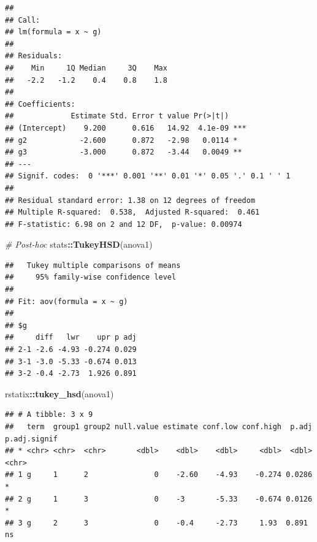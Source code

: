 \documentclass[
]{book}
\newenvironment{Shaded}{\begin{snugshade}}{\end{snugshade}}
\newcommand{\CommentTok}[1]{\textcolor[rgb]{0.56,0.35,0.01}{\textit{#1}}}
\newcommand{\KeywordTok}[1]{\textcolor[rgb]{0.13,0.29,0.53}{\textbf{#1}}}
\newcommand{\NormalTok}[1]{#1}
\newcommand{\OperatorTok}[1]{\textcolor[rgb]{0.81,0.36,0.00}{\textbf{#1}}}
\theoremstyle{definition}
\theoremstyle{definition}
\theoremstyle{definition}
\theoremstyle{remark}
\begin{document}
\begin{verbatim}
## 
## Call:
## lm(formula = x ~ g)
## 
## Residuals:
##    Min     1Q Median     3Q    Max 
##   -2.2   -1.2    0.4    0.8    1.8 
## 
## Coefficients:
##             Estimate Std. Error t value Pr(>|t|)    
## (Intercept)    9.200      0.616   14.92  4.1e-09 ***
## g2            -2.600      0.872   -2.98   0.0114 *  
## g3            -3.000      0.872   -3.44   0.0049 ** 
## ---
## Signif. codes:  0 '***' 0.001 '**' 0.01 '*' 0.05 '.' 0.1 ' ' 1
## 
## Residual standard error: 1.38 on 12 degrees of freedom
## Multiple R-squared:  0.538,  Adjusted R-squared:  0.461 
## F-statistic: 6.98 on 2 and 12 DF,  p-value: 0.00974
\end{verbatim}

\begin{Shaded}
\begin{Highlighting}[]
\CommentTok{\# Post{-}hoc}
\NormalTok{stats}\OperatorTok{::}\KeywordTok{TukeyHSD}\NormalTok{(anova1)}
\end{Highlighting}
\end{Shaded}

\begin{verbatim}
##   Tukey multiple comparisons of means
##     95% family-wise confidence level
## 
## Fit: aov(formula = x ~ g)
## 
## $g
##     diff   lwr    upr p adj
## 2-1 -2.6 -4.93 -0.274 0.029
## 3-1 -3.0 -5.33 -0.674 0.013
## 3-2 -0.4 -2.73  1.926 0.891
\end{verbatim}

\begin{Shaded}
\begin{Highlighting}[]
\NormalTok{rstatix}\OperatorTok{::}\KeywordTok{tukey\_hsd}\NormalTok{(anova1)}
\end{Highlighting}
\end{Shaded}

\begin{verbatim}
## # A tibble: 3 x 9
##   term  group1 group2 null.value estimate conf.low conf.high  p.adj p.adj.signif
## * <chr> <chr>  <chr>       <dbl>    <dbl>    <dbl>     <dbl>  <dbl> <chr>       
## 1 g     1      2               0    -2.60    -4.93    -0.274 0.0286 *           
## 2 g     1      3               0    -3       -5.33    -0.674 0.0126 *           
## 3 g     2      3               0    -0.4     -2.73     1.93  0.891  ns
\end{verbatim}
\end{document}
